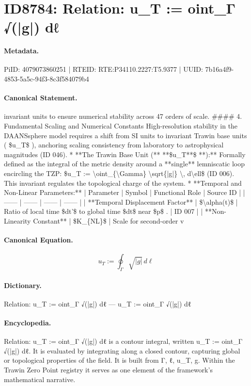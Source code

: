 \section*{ID8784: Relation: u\_T := oint\_Γ √(|g|) dℓ}
\paragraph{Metadata.}
PiID: 4079073860251 | RTEID: RTE:P34110.2227:T5.9377 | UUID: 7b16a4f9-4853-5a5c-94f3-8c3f584079b4

\paragraph{Canonical Statement.}
invariant units to ensure numerical stability across 47 orders of scale. \#\#\#\# 4. Fundamental Scaling and Numerical Constants High-resolution stability in the DAANSsphere model requires a shift from SI units to invariant Trawin base units ( \$u\_T\$ ), anchoring scaling consistency from laboratory to astrophysical magnitudes (ID 046). * **The Trawin Base Unit (** **\$u\_T**\$ **):** Formally defined as the integral of the metric density around a **single** lemniscatic loop encircling the TZP: \$u\_T := \textbackslash{}oint\_\{\textbackslash{}Gamma\} \textbackslash{}sqrt\{|g|\} \textbackslash{}, d\textbackslash{}ell\$ (ID 006). This invariant regulates the topological charge of the system. * **Temporal and Non-Linear Parameters:** | Parameter | Symbol | Functional Role | Source ID | | ------ | ------ | ------ | ------ | | **Temporal Displacement Factor** | \$\textbackslash{}alpha(t)\$ | Ratio of local time \$dt'\$ to global time \$dt\$ near \$p\$ . | ID 007 | | **Non-Linearity Constant** | \$K\_\{NL\}\$ | Scale for second-order v

\paragraph{Canonical Equation.}
\[
u_T := \oint_{\Gamma} \sqrt{|g|} \, d\ell
\]

\paragraph{Dictionary.}
Relation: u\_T := oint\_Γ √(|g|) dℓ — u\_T := oint\_Γ √(|g|) dℓ

\paragraph{Encyclopedia.}
Relation: u\_T := oint\_Γ √(|g|) dℓ is a contour integral, written u\_T := oint\_Γ √(|g|) dℓ. It is evaluated by integrating along a closed contour, capturing global or topological properties of the field. It is built from Γ, ℓ, u\_T, g. Within the Trawin Zero Point registry it serves as one element of the framework's mathematical narrative.
